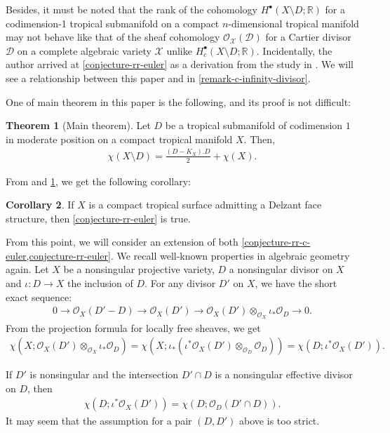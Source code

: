 \documentclass[a4paper,dvipdfmx,reqno,12pt]{amsart}
\theoremstyle{definition}
\newtheorem{theorem}{Theorem}[section]
\newtheorem{corollary}[theorem]{Corollary}
\numberwithin{equation}{section}
\begin{document}
Besides, it must be noted that
the rank of the cohomology 
$H^{\bullet}(X\setminus D;\mathbb{R})$ 
for a codimension-1 tropical submanifold
on a compact $n$-dimensional tropical manifold
may not behave like that of
the sheaf cohomology 
$\mathcal{O}_{\mathcal{X}}(\mathcal{D})$
for a Cartier divisor $\mathcal{D}$ 
on a complete algebraic variety
$\mathcal{X}$ unlike
$H^{\bullet}_c(X\setminus D;\mathbb{R})$.
Incidentally, the author arrived at
\cref{conjecture-rr-euler} as
a derivation from the study in
\cite{tsutsui2023graded}. 
We will see a relationship between 
this paper and \cite{tsutsui2023graded}
in \cref{remark-c-infinity-divisor}.

One of main theorem in this paper
is the following, and its proof is not difficult:
\begin{theorem}[{Main theorem}]
\label{theorem-rr-euler-surface}
Let $D$ be a tropical submanifold of codimension $1$
in moderate position on a compact tropical manifold
$X$. Then,
\begin{align}
\chi(X\setminus D)=\frac{(D-K_X). D}{2}+
\chi(X).
\end{align}
\end{theorem}
From \cite[Theorem 6.3]{demedrano2023chern}
and \cref{theorem-rr-euler-surface}, we get
the following corollary:
\begin{corollary}
\label{corollary-ds-euler-rr}
If $X$ is a compact tropical surface admitting 
a Delzant face structure, then
\cref{conjecture-rr-euler} is true.
\end{corollary}
From this point, 
we will consider an extension of both
\cref{conjecture-rr-c-euler,conjecture-rr-euler}.
We recall well-known properties in algebraic geometry again.
Let $X$ be a nonsingular projective variety,
$D$ a nonsingular divisor on $X$ and
$\iota\colon D\to X$ the inclusion of $D$.
For any divisor $D'$ on $X$, we have
the short exact sequence:
\begin{align}
0 \to \mathcal{O}_X(D'-D)\to \mathcal{O}_X(D')
\to \mathcal{O}_X(D')
\otimes_{\mathcal{O}_X} \iota_*\mathcal{O}_D \to 0. 
\end{align}
From the projection formula for locally free sheaves,
we get 
\begin{align}
\chi(X;\mathcal{O}_X(D')\otimes_{\mathcal{O}_X} \iota_*\mathcal{O}_D)
=\chi(X;\iota_*(\iota^{*}\mathcal{O}_X(D')\otimes_{\mathcal{O}_D} \mathcal{O}_D))
=\chi(D;\iota^{*}\mathcal{O}_X(D')).
\end{align}

If $D'$ is nonsingular and the intersection
$D'\cap D$ is a nonsingular effective divisor
on $D$, then
\begin{align}
\chi(D;\iota^{*}\mathcal{O}_X(D'))=\chi(D;\mathcal{O}_D(D'\cap D)).
\end{align}
It may seem that 
the assumption for a pair $(D,D')$ above is
too strict.
\end{document}
